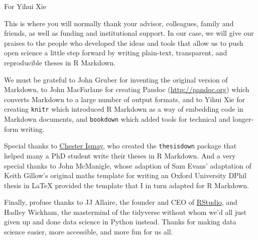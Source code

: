 \documentclass[a4paper, nobind]{templates/ociamthesis}
\begin{document}
\setcounter{secnumdepth}{2}
\setcounter{tocdepth}{1}



\begin{romanpages}

\maketitle

\begin{dedication}
  For Yihui Xie
\end{dedication}



\begin{acknowledgements}
 	This is where you will normally thank your advisor, colleagues, family and friends, as well as funding and institutional support. In our case, we will give our praises to the people who developed the ideas and tools that allow us to push open science a little step forward by writing plain-text, transparent, and reproducible theses in R Markdown.

 We must be grateful to John Gruber for inventing the original version of Markdown, to John MacFarlane for creating Pandoc (\url{http://pandoc.org}) which converts Markdown to a large number of output formats, and to Yihui Xie for creating \texttt{knitr} which introduced R Markdown as a way of embedding code in Markdown documents, and \texttt{bookdown} which added tools for technical and longer-form writing.

 Special thanks to \href{http://chester.rbind.io}{Chester Ismay}, who created the \texttt{thesisdown} package that helped many a PhD student write their theses in R Markdown. And a very special thanks to John McManigle, whose adaption of Sam Evans' adaptation of Keith Gillow's original maths template for writing an Oxford University DPhil thesis in LaTeX provided the template that I in turn adapted for R Markdown.

 Finally, profuse thanks to JJ Allaire, the founder and CEO of \href{http://rstudio.com}{RStudio}, and Hadley Wickham, the mastermind of the tidyverse without whom we'd all just given up and done data science in Python instead. Thanks for making data science easier, more accessible, and more fun for us all.


\end{acknowledgements}
\end{romanpages}
\end{document}
